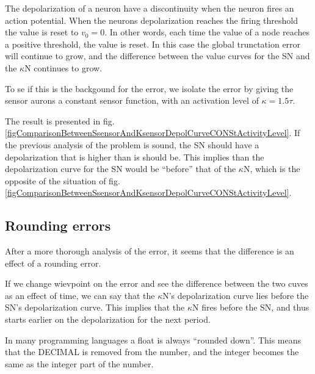 The depolarization of a neuron have a discontinuity when the neuron fires an action potential. 
When the neurons depolarization reaches the firing threshold the value is reset to $v_0 = 0$.
In other words, each time the value of a node reaches a positive threshold, the value is reset.
In this case the global trunctation error will continue to grow, and the difference between the value curves for the SN and the $\kappa$N continues to grow. %

To se if this is the backgound for the error, we isolate the error by giving the sensor aurons a constant sensor function, with an activation level of $\kappa = 1.5 \tau$.

The result is presented in fig. \ref{figComparisonBetweenSsensorAndKsensorDepolCurveCONStActivityLevel}. %
If the previous analysis of the problem is sound, the SN should have a depolarization that is higher than is should be.
This implies than the depolarization curve for the SN would be ``before'' that of the $\kappa$N, which is the opposite of the situation of fig. \ref{figComparisonBetweenSsensorAndKsensorDepolCurveCONStActivityLevel}.





	\subsection{Rounding errors}
After a more thorough analysis of the error, it seems that the difference is an effect of a rounding error.

If we change wievpoint on the error and see the difference between the two cuves as an effect of time, we can say that the $\kappa$N's depolarization curve lies before the SN's depolarization curve.
This implies that the $\kappa$N fires before the SN, and thus starts earlier on the depolarization for the next period.

In many programming languages a float is always ``rounded down''. This means that the DECIMAL %
	is removed from the number, and the integer becomes the same as the integer part of the number.

